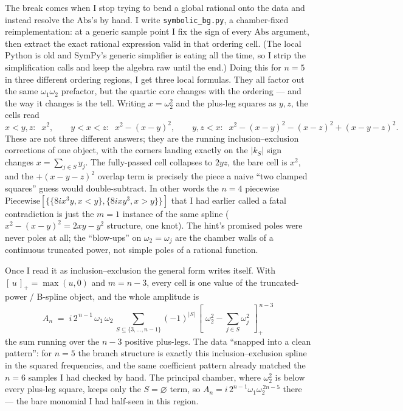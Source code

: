 \documentclass{article}
\newcommand{\pp}[1]{\left[\,#1\,\right]_{+}}
\begin{document}
The break comes when I stop trying to bend a global rational onto the data and
instead resolve the $\mathrm{Abs}$'s by hand. I write \texttt{symbolic\_bg.py}, a
chamber-fixed reimplementation: at a generic sample point I fix the sign of every
$\mathrm{Abs}$ argument, then extract the exact rational expression valid in that
ordering cell. (The local Python is old and SymPy's generic simplifier is eating
all the time, so I strip the simplification calls and keep the algebra raw until
the end.) Doing this for $n=5$ in three different ordering regions, I get three
local formulas. They all factor out the same $\omega_1\omega_2$ prefactor, but the
quartic core changes with the ordering --- and the way it changes is the tell.
Writing $x=\omega_2^2$ and the plus-leg squares as $y,z$, the cells read
\[
x<y,z:\;\; x^{2},\qquad
y<x<z:\;\; x^{2}-(x-y)^{2},\qquad
y,z<x:\;\; x^{2}-(x-y)^{2}-(x-z)^{2}+(x-y-z)^{2}.
\]
These are not three different answers; they are the running
inclusion--exclusion corrections of one object, with the corners landing exactly
on the $|k_S|$ sign changes $x=\sum_{j\in S}y_j$. The fully-passed cell collapses
to $2yz$, the bare cell is $x^2$, and the $+(x-y-z)^2$ overlap term is precisely
the piece a naive ``two clamped squares'' guess would double-subtract. In other
words the $n=4$ piecewise $\mathrm{Piecewise}[\{\{8ix^3y,x<y\},\{8ixy^3,x>y\}\}]$
that I had earlier called a fatal contradiction is just the $m=1$ instance of the
same spline ($x^2-(x-y)^2=2xy-y^2$ structure, one knot). The hint's promised poles
were never poles at all; the ``blow-ups'' on $\omega_2=\omega_j$ are the chamber
walls of a continuous truncated power, not simple poles of a rational function.

Once I read it as inclusion--exclusion the general form writes itself. With
$\pp{u}=\max(u,0)$ and $m=n-3$, every cell is one value of the truncated-power /
B-spline object, and the whole amplitude is
\[
\boxed{\;
A_n \;=\; i\,2^{\,n-1}\,\omega_1\,\omega_2\,
\sum_{S\subseteq\{3,\dots,n-1\}}(-1)^{|S|}\,
\pp{\,\omega_2^{2}-\sum_{j\in S}\omega_j^{2}\,}^{\,n-3}\;}
\]
the sum running over the $n-3$ positive plus-legs. The data ``snapped into a
clean pattern'': for $n=5$ the branch structure is exactly this
inclusion--exclusion spline in the squared frequencies, and the same coefficient
pattern already matched the $n=6$ samples I had checked by hand. The
principal chamber, where $\omega_2^2$ is below every plus-leg square, keeps
only the $S=\varnothing$ term, so $A_n=i\,2^{n-1}\omega_1\omega_2^{\,2n-5}$
there --- the bare monomial I had half-seen in this region.
\end{document}
